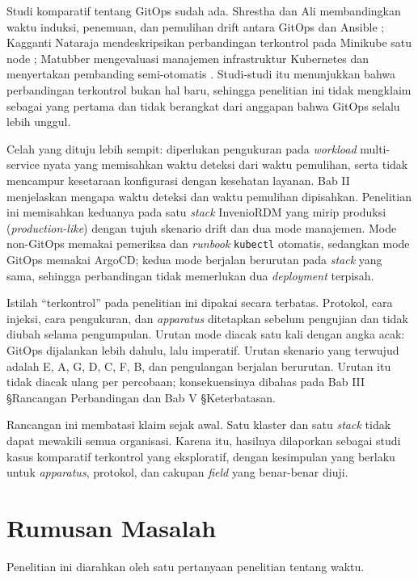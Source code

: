 Studi komparatif tentang GitOps sudah ada. Shrestha dan Ali membandingkan waktu induksi, penemuan, dan pemulihan drift antara GitOps dan Ansible \citep{shrestha2024configuration}; Kagganti Nataraja mendeskripsikan perbandingan terkontrol pada Minikube satu node \citep{kaggantinataraja2025security}; Matubber mengevaluasi manajemen infrastruktur Kubernetes dan menyertakan pembanding semi-otomatis \citep{matubber2025managing}. Studi-studi itu menunjukkan bahwa perbandingan terkontrol bukan hal baru, sehingga penelitian ini tidak mengklaim sebagai yang pertama dan tidak berangkat dari anggapan bahwa GitOps selalu lebih unggul.

Celah yang dituju lebih sempit: diperlukan pengukuran pada \textit{workload} multi-service nyata yang memisahkan waktu deteksi dari waktu pemulihan, serta tidak mencampur kesetaraan konfigurasi dengan kesehatan layanan. Bab II menjelaskan mengapa waktu deteksi dan waktu pemulihan dipisahkan. Penelitian ini memisahkan keduanya pada satu \textit{stack} InvenioRDM yang mirip produksi (\textit{production-like}) dengan tujuh skenario drift dan dua mode manajemen. Mode non-GitOps memakai pemeriksa dan \textit{runbook} \texttt{kubectl} otomatis, sedangkan mode GitOps memakai ArgoCD; kedua mode berjalan berurutan pada \textit{stack} yang sama, sehingga perbandingan tidak memerlukan dua \textit{deployment} terpisah.

Istilah ``terkontrol'' pada penelitian ini dipakai secara terbatas. Protokol, cara injeksi, cara pengukuran, dan \textit{apparatus} ditetapkan sebelum pengujian dan tidak diubah selama pengumpulan. Urutan mode diacak satu kali dengan angka acak: GitOps dijalankan lebih dahulu, lalu imperatif. Urutan skenario yang terwujud adalah E, A, G, D, C, F, B, dan pengulangan berjalan berurutan. Urutan itu tidak diacak ulang per percobaan; konsekuensinya dibahas pada Bab III §Rancangan Perbandingan dan Bab V §Keterbatasan.

Rancangan ini membatasi klaim sejak awal. Satu klaster dan satu \textit{stack} tidak dapat mewakili semua organisasi. Karena itu, hasilnya dilaporkan sebagai studi kasus komparatif terkontrol yang eksploratif, dengan kesimpulan yang berlaku untuk \textit{apparatus}, protokol, dan cakupan \textit{field} yang benar-benar diuji.

\section{Rumusan Masalah}

Penelitian ini diarahkan oleh satu pertanyaan penelitian tentang waktu.

